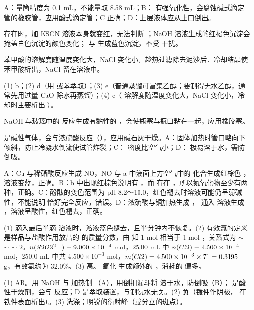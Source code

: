 \begin{jiexilist}
\item {}A：量筒精度为 0.1 mL，不能量取 8.58 mL；B： 有强氧化性，会腐蚀碱式滴定管的橡胶管，应用酸式滴定管；C 正确；D：上层液体应从上口倒出。
\item {} 存在时，加 KSCN 溶液本身就变红，无法判断 ；NaOH 溶液生成的红褐色沉淀会掩盖白色沉淀的颜色变化； 与  生成蓝色沉淀，不受  干扰。
\item {}苯甲酸的溶解度随温度变化大，NaCl 变化小。趁热过滤除去泥沙后，冷却结晶使苯甲酸析出，NaCl 留在溶液中。
\item (1) b；(2) d（用  或苯萃取）；(3) e（普通蒸馏可富集乙醇；要制得无水乙醇，通常先用过量 CaO 除水再蒸馏）；(4) c（ 溶解度随温度变化大，NaCl 变化小，冷却时主要析出 ）。
\item {}NaOH 与玻璃中的  反应生成有黏性的 ，会使瓶塞与瓶口粘在一起，应用橡胶塞。
\item {} 是碱性气体，会与浓硫酸反应（），应用碱石灰干燥。A：固体加热时管口略向下倾斜，防止冷凝水倒流使试管炸裂；C： 密度比空气小；D： 极易溶于水，需防倒吸。
\item {}A：Cu 与稀硝酸反应生成 NO，NO 与 a 中液面上方空气中的  化合生成红棕色 ，溶液变蓝，正确。B：b 中出现红棕色说明有 ，而  存在 ，所以氮氧化物至少有两种，正确。C：酚酞的变色范围为 pH 8.2～10.0，红色褪去时溶液可能仍呈弱碱性，不能说明  恰好完全反应，错误。D：浓硫酸与铜加热生成 ， 通入  溶液生成 ，溶液呈酸性，红色褪去，正确。
\item (1) 滴入最后半滴  溶液时，溶液蓝色褪去，且半分钟内不恢复。(2) 有效氯的定义是样品与盐酸作用放出的  的质量分数，由  知 1 mol  相当于 1 mol ，关系式为  $\sim$  $\sim$  $\sim$ 2。$n(S2O3^2-)=9.000\times10^{-4}$ mol，25.00 mL 中 $n(Cl2)=4.500\times10^{-4}$ mol，250.0 mL 中共 $4.500\times10^{-3}$ mol，$m(Cl2)=4.500\times10^{-3}\times71=0.3195$ g，有效氯约为 32.0\%。(3) 高。 氧化  生成额外的 ，消耗的  偏多。
\item (1) AB。用 NaOH 与  加热制 （A），用倒扣漏斗将  溶于水，防倒吸（B）； 是酸性干燥剂，会与  反应；D 是萃取装置，与制氨水无关。(2) 负（镀件作阴极， 在铁件表面析出）。(3) 洗涤；明锐的衍射峰（或分立的斑点）。

\end{jiexilist}

